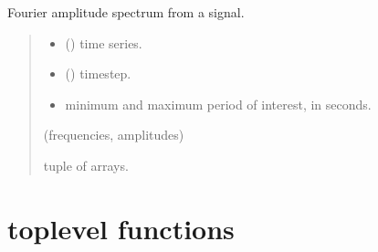 \documentclass[letterpaper,10pt,english]{sphinxmanual}
\begin{document}

\begin{fulllineitems}
\label{\detokenize{library/mdof.transform:mdof.transform.fourier_spectrum}}
\pysigstartsignatures
{}
\pysigstopsignatures
\sphinxAtStartPar
Fourier amplitude spectrum from a signal.
\begin{quote}\begin{description}
\begin{itemize}
\item {} 
\sphinxAtStartPar
{} () \textendash{} time series.

\item {} 
\sphinxAtStartPar
{} () \textendash{} timestep.

\item {} 
\sphinxAtStartPar
{} \textendash{} minimum and maximum period of interest, in seconds.

\end{itemize}

\sphinxAtStartPar
(frequencies, amplitudes)

\sphinxAtStartPar
tuple of arrays.

\end{description}\end{quote}

\end{fulllineitems}



\section{top\sphinxhyphen{}level functions}
\label{\detokenize{library/index:module-mdof}}\label{\detokenize{library/index:top-level-functions}}
\end{document}
